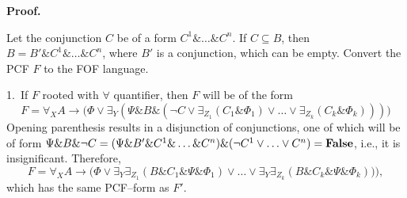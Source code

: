 \documentclass[a4paper,12pt]{article}
\begin{document}
\begin{center}
\end{center}

\textbf{Proof.}

Let the conjunction $C$ be of a form $C^1\&\ldots\& C^n$.  If $C\subseteq B$, then $B = B'\&C^1\&\ldots\& C^n$, where $B'$ is a conjunction, which can be empty.  Convert the PCF $F$ to the FOF language.

1.~If $F$ rooted with $\forall$ quantifier, then $F$ will be of the form
$$F = \forall_X A\rightarrow\bigl(\Phi\vee\exists_Y(\Psi\& B\&(\neg C\vee\exists_{Z_1}(C_1\&\Phi_1)\vee\ldots\vee\exists_{Z_k}(C_k\&\Phi_k)))\bigr)$$
Opening parenthesis results in a disjunction of conjunctions, one of which will be of form $\Psi\&B\&\neg C = (\Psi\&B'\&C^1\&\ldots\& C^n)\&(\neg C^1\vee\ldots\vee C^n) = \text{\textbf{False}}$, i.e., it is insignificant.  Therefore,
$$F = \forall_X A\rightarrow\bigl(\Phi\vee\exists_Y\exists_{Z_1}(B\&C_1\&\Psi\&\Phi_1)\vee\ldots\vee\exists_Y\exists_{Z_k}(B\&C_k\&\Psi\&\Phi_k))\bigr),$$
which has the same PCF--form as $F'$.
\end{document}
